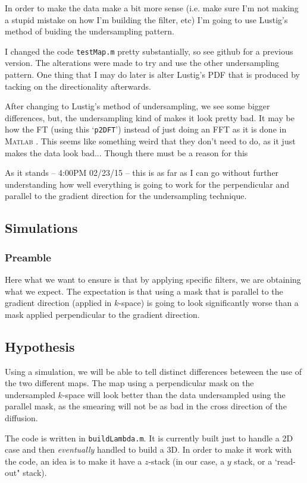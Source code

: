 \documentclass[11 pt]{article}
\newcommand{\matlab}{\textsc{Matlab }}
\begin{document}
    In order to make the data make a bit more sense (i.e. make sure I'm not making a stupid mistake on how I'm building the filter, etc) I'm going to use Lustig's method of buiding the undersampling pattern.

    I changed the code \verb!testMap.m! pretty substantially, so see github for a previous version. The alterations were made to try and use the other undersampling pattern. One thing that I may do later is alter Lustig's PDF that is produced by tacking on the directionality afterwards.

    After changing to Lustig's method of undersampling, we see some bigger differences, but, the undersampling kind of makes it look pretty bad. It may be how the FT (using this `\verb!p2DFT!') instead of just doing an FFT as it is done in \matlab. This seems like something weird that they don't need to do, as it just makes the data look bad... Though there must be a reason for this

    As it stands -- 4:00PM 02/23/15 -- this is as far as I can go without further understanding how well everything is going to work for the perpendicular and parallel to the gradient direction for the undersampling technique.

\subsection{Simulations}
    \subsubsection{Preamble}
    Here what we want to ensure is that by applying specific filters, we are obtaining what we expect. The expectation is that using a mask that is parallel to the gradient direction (applied in $k$-space) is going to look significantly worse than a mask applied perpendicular to the gradient direction.

  \subsection{Hypothesis}
  Using a simulation, we will be able to tell distinct differences beteween the use of the two different maps. The map using a perpendicular mask on the undersampled $k$-space will look better than the data undersampled using the parallel mask, as the smearing will not be as bad in the cross direction of the diffusion.

  The code is written in \verb!buildLambda.m!. It is currently built just to handle a 2D case and then \emph{eventually} handled to build a 3D. In order to make it work with the code, an idea is to make it have a $z$-stack (in our case, a $y$ stack, or a `read-out" stack). \\ \\ 
\end{document}
